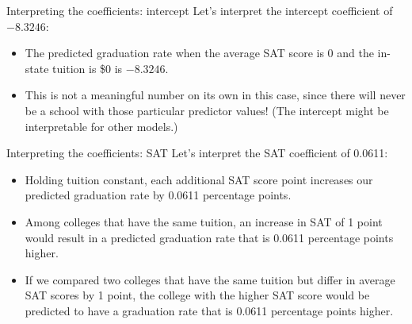 \documentclass{beamer}\usepackage[]{graphicx}\usepackage[]{color}
\newenvironment{knitrout}{}{} %
\begin{document}
\begin{darkframes}
    \begin{frame}[fragile]
\begin{knitrout}


\end{knitrout}
    \end{frame}

    \begin{frame}{Interpreting the coefficients: intercept}
      Let's interpret the intercept coefficient of $-8.3246$:
      \begin{itemize}[<+->]
        \item The predicted graduation rate when the average SAT score is 0 and the in-state tuition is \$0 is $-8.3246$.
        \item This is not a meaningful number on its own in this case, since there will never be a school with those particular predictor values! (The intercept might be interpretable for other models.)
      \end{itemize}
    \end{frame}

    \begin{frame}{Interpreting the coefficients: SAT}
      Let's interpret the SAT coefficient of 0.0611:
      \begin{itemize}[<+->]
        \item \alert{Holding tuition constant}, each additional SAT score point  increases our predicted graduation rate by 0.0611 percentage points.
        \item \alert{Among colleges that have the same tuition}, an increase in SAT of 1 point would result in a predicted graduation rate that is 0.0611 percentage points higher.
        \item \alert{If we compared two colleges that have the same tuition but differ in average SAT scores by 1 point}, the college with the higher SAT score would be predicted to have a graduation rate that is 0.0611 percentage points higher.
      \end{itemize}
    \end{frame}


\end{darkframes}
\end{document}

